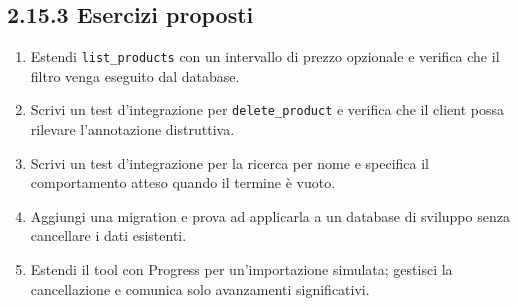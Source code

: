 \documentclass[
  italian,
  10pt,
]{book}
\providecommand{\tightlist}{%
  \setlength{\itemsep}{0pt}\setlength{\parskip}{0pt}}
\begin{document}
\subsection{2.15.3 Esercizi proposti}\label{esercizi-proposti}

\begin{enumerate}
\def\labelenumi{\arabic{enumi}.}
\tightlist
\item
  Estendi \texttt{list\_products} con un intervallo di prezzo opzionale
  e verifica che il filtro venga eseguito dal database.
\item
  Scrivi un test d'integrazione per \texttt{delete\_product} e verifica
  che il client possa rilevare l'annotazione distruttiva.
\item
  Scrivi un test d'integrazione per la ricerca per nome e specifica il
  comportamento atteso quando il termine è vuoto.
\item
  Aggiungi una migration e prova ad applicarla a un database di sviluppo
  senza cancellare i dati esistenti.
\item
  Estendi il tool con Progress per un'importazione simulata; gestisci la
  cancellazione e comunica solo avanzamenti significativi.
\end{enumerate}

\backmatter
\end{document}
